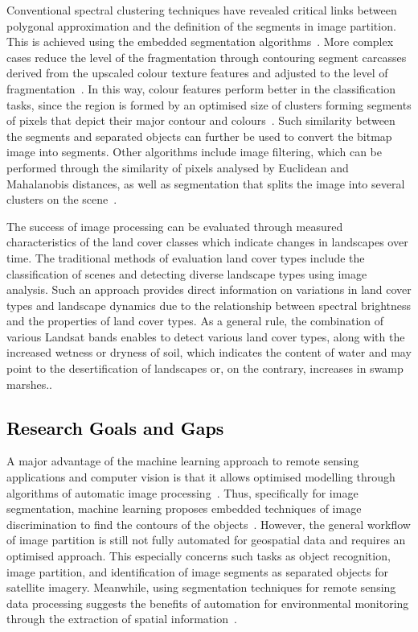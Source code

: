 \documentclass[analytics,article,accept,pdftex,moreauthors]{Definitions/mdpi}
\begin{document}
Conventional spectral clustering techniques have revealed critical links between  polygonal approximation and the definition of the segments in image partition. This is achieved using the embedded segmentation algorithms~\cite{Saha,Pugazhenthi,Congetal2018}. More complex cases reduce the level of the fragmentation through contouring segment carcasses derived from the upscaled colour texture features and adjusted to the level of fragmentation~\cite{1370344}. In this way, colour features perform better in the classification tasks, since the region is formed by an optimised size of clusters forming segments of pixels that depict their major contour and colours~\cite{1421832}. Such similarity between the segments and separated objects can further be used to convert the bitmap image into segments. Other algorithms include image filtering, which can be performed through the similarity of pixels analysed by Euclidean and Mahalanobis distances, as well as segmentation that splits the image into several clusters on the scene~\cite{8302195,9302320,5432655}. 

{The success of image processing can be evaluated through measured characteristics of the land cover classes which indicate changes in landscapes over time. The traditional methods of evaluation  land cover types include the classification of scenes and detecting diverse landscape types using image analysis. Such an approach provides direct information on variations in land cover types and landscape dynamics due to the relationship between spectral brightness and the properties of land cover types. As a general rule, the combination of various Landsat bands enables to detect various land cover types, along with the increased wetness or dryness of soil,  which indicates the content of water and may point to the desertification of landscapes or, on the contrary, increases in swamp marshes.}. 

\subsection{\textcolor{black}{Research Goals and Gaps}}
A major advantage of the machine learning approach to remote sensing applications and computer vision is that it allows  optimised modelling through algorithms of automatic image processing~\cite{Yamashita,OLIVEIRA2020111830,Bauer,Onishi}. Thus, specifically for image segmentation, machine learning proposes embedded techniques of image discrimination to find the contours of the objects~\cite{10073848,8402497,9113204}. However, the general workflow of image partition is still not fully automated for geospatial data and requires an optimised approach. This especially concerns such tasks as object recognition, image partition, and identification of image segments as separated objects for satellite imagery. Meanwhile, using segmentation techniques for remote sensing data processing suggests the benefits of automation for environmental monitoring through the extraction of spatial information~\cite{Colwell}. %
\end{document}
